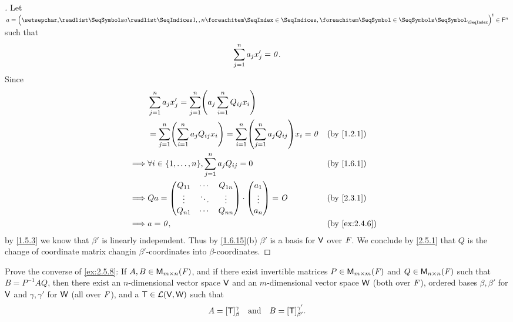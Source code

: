 \begin{proof}[]
	Let \(a = \tp{\tuple{a}{1,,n}} \in \vs{F}^n\) such that
	\[
		\sum_{j = 1}^n a_j x_j' = \mathit{0}.
	\]
	Since
	\begin{align*}
		         & \sum_{j = 1}^n a_j x_j' = \sum_{j = 1}^n \pa{a_j \sum_{i = 1}^n Q_{i j} x_i}                                                             \\
		         & = \sum_{j = 1}^n \pa{\sum_{i = 1}^n a_j Q_{i j} x_i} = \sum_{i = 1}^n \pa{\sum_{j = 1}^n a_j Q_{i j}} x_i = \zv &  & \by{1.2.1}          \\
		\implies & \forall i \in \set{1, \dots, n}, \sum_{j = 1}^n a_j Q_{i j} = 0                                                 &  & \by{1.6.1}          \\
		\implies & Qa = \begin{pmatrix}
			                Q_{1 1} & \cdots & Q_{1 n} \\
			                \vdots  & \ddots & \vdots  \\
			                Q_{n 1} & \cdots & Q_{n n}
		                \end{pmatrix} \cdot \begin{pmatrix}
			                                    a_1    \\
			                                    \vdots \\
			                                    a_n
		                                    \end{pmatrix} = \zm                                                                             &  & \by{2.3.1} \\
		\implies & a = \zv,                                                                                                        &  & \by{ex:2.4.6}
	\end{align*}
	by \cref{1.5.3} we know that \(\beta'\) is linearly independent.
	Thus by \cref{1.6.15}(b) \(\beta'\) is a basis for \(\mathsf{V}\) over \(\mathit{F}\).
	We conclude by \cref{2.5.1} that \(Q\) is the change of coordinate matrix changin \(\beta'\)-coordinates into \(\beta\)-coordinates.
\end{proof}

\begin{ex}\label{ex:2.5.14}
	Prove the converse of \cref{ex:2.5.8}:
	If \(A, B \in \mathsf{M}_{{m} \times n}({\mathit{F}})\), and if there exist invertible matrices \(P \in \mathsf{M}_{{m} \times m}({\mathit{F}})\) and \(Q \in \mathsf{M}_{{n} \times n}({\mathit{F}})\) such that \(B = P^{-1} A Q\), then there exist an \(n\)-dimensional vector space \(\mathsf{V}\) and an \(m\)-dimensional vector space \(\mathsf{W}\) (both over \(\mathit{F}\)), ordered bases \(\beta, \beta'\) for \(\mathsf{V}\) and \(\gamma, \gamma'\) for \(\mathsf{W}\) (all over \(\mathit{F}\)), and a \(\mathsf{T} \in \mathcal{L}(\mathsf{V}, \mathsf{W})\) such that
	\[
		A = [\mathsf{T}]_{\beta}^{\gamma} \quad \text{and} \quad B = [\mathsf{T}]_{\beta'}^{\gamma'}.
	\]
\end{ex}

